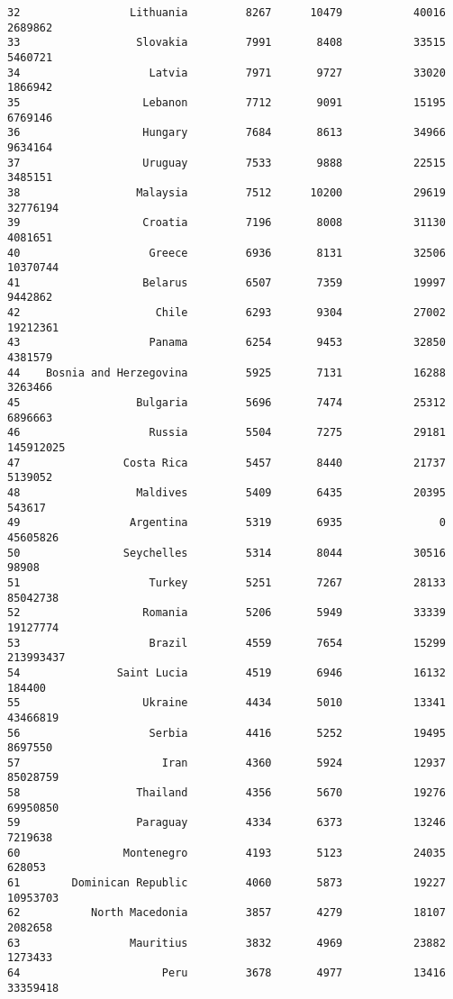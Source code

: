 \documentclass[
]{article}
\begin{document}
\begin{verbatim}
32                 Lithuania         8267      10479           40016    2689862
33                  Slovakia         7991       8408           33515    5460721
34                    Latvia         7971       9727           33020    1866942
35                   Lebanon         7712       9091           15195    6769146
36                   Hungary         7684       8613           34966    9634164
37                   Uruguay         7533       9888           22515    3485151
38                  Malaysia         7512      10200           29619   32776194
39                   Croatia         7196       8008           31130    4081651
40                    Greece         6936       8131           32506   10370744
41                   Belarus         6507       7359           19997    9442862
42                     Chile         6293       9304           27002   19212361
43                    Panama         6254       9453           32850    4381579
44    Bosnia and Herzegovina         5925       7131           16288    3263466
45                  Bulgaria         5696       7474           25312    6896663
46                    Russia         5504       7275           29181  145912025
47                Costa Rica         5457       8440           21737    5139052
48                  Maldives         5409       6435           20395     543617
49                 Argentina         5319       6935               0   45605826
50                Seychelles         5314       8044           30516      98908
51                    Turkey         5251       7267           28133   85042738
52                   Romania         5206       5949           33339   19127774
53                    Brazil         4559       7654           15299  213993437
54               Saint Lucia         4519       6946           16132     184400
55                   Ukraine         4434       5010           13341   43466819
56                    Serbia         4416       5252           19495    8697550
57                      Iran         4360       5924           12937   85028759
58                  Thailand         4356       5670           19276   69950850
59                  Paraguay         4334       6373           13246    7219638
60                Montenegro         4193       5123           24035     628053
61        Dominican Republic         4060       5873           19227   10953703
62           North Macedonia         3857       4279           18107    2082658
63                 Mauritius         3832       4969           23882    1273433
64                      Peru         3678       4977           13416   33359418

\end{verbatim}
\end{document}
